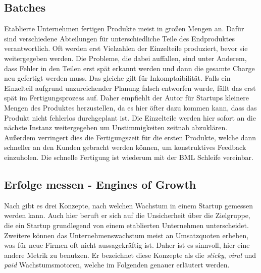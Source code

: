 \subsection*{\label{sec:LeanStartup-Batches}\thesubsection\quad Batches}
Etablierte Unternehmen fertigen Produkte meist in großen Mengen an. Dafür sind verschiedene Abteilungen für unterschiedliche Teile des Endproduktes verantwortlich. Oft werden erst Vielzahlen der Einzelteile produziert, bevor sie weitergegeben werden. Die Probleme, die \citeauthor{TheLeanStartup} dabei auffallen, sind unter Anderem, dass Fehler in den Teilen erst spät erkannt werden und dann die gesamte Charge neu gefertigt werden muss. Das gleiche gilt für Inkomptaibilität. Falls ein Einzelteil aufgrund unzureichender Planung falsch entworfen wurde, fällt das erst spät im Fertigungsprozess auf. Daher empfiehlt der Autor für Startups kleinere Mengen des Produktes herzustellen, da es hier öfter dazu kommen kann, dass das Produkt nicht fehlerlos durchgeplant ist. Die Einzelteile werden hier sofort an die nächste Instanz weitergegeben um Unstimmigkeiten zeitnah abzuklären. Außerdem verringert dies die Fertigungszeit für die ersten Produkte, welche dann schneller an den Kunden gebracht werden können, um konstruktives Feedback einzuholen. Die schnelle Fertigung ist wiederum mit der \ac{BML} Schleife vereinbar.

\subsection*{\label{sec:LeanStartup-EnginesOfGrowth}\thesubsection\quad Erfolge messen - Engines of Growth}
Nach \citeauthor{TheLeanStartup} gibt es drei Konzepte, nach welchen Wachstum in einem Startup gemessen werden kann. Auch hier beruft er sich auf die Unsicherheit über die Zielgruppe, die ein Startup grundlegend von einem etablierten Unternehmen unterscheidet. Zweitere können das Unternehmenswachstum meist an Umsatzquoten erheben, was für neue Firmen oft nicht aussagekräftig ist. Daher ist es sinnvoll, hier eine andere Metrik zu benutzen. Er bezeichnet diese Konzepte als die \textit{sticky}, \textit{viral} und \textit{paid} Wachstumsmotoren, welche im Folgenden genauer erläutert werden.


